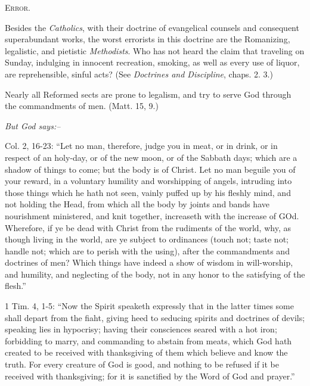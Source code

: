 \documentclass[
]{book}
\begin{document}
\begin{center}
\textsc{Error.}
\end{center}

Besides the \emph{Catholics}, with their doctrine of evangelical counsels and consequent superabundant works, the worst errorists in this doctrine are the Romanizing, legalistic, and pietistic \emph{Methodists}. Who has not heard the claim that traveling on Sunday, indulging in innocent recreation, smoking, as well as every use of liquor, are reprehensible, sinful acts? (See \emph{Doctrines and Discipline}, chaps. 2. 3.)

Nearly all Reformed sects are prone to legalism, and try to serve God through the commandments of men. (Matt. 15, 9.)

\begin{center}
\textsl{But God says:--}
\end{center}

Col. 2, 16-23: ``Let no man, therefore, judge you in meat, or in drink, or in respect of an holy-day, or of the new moon, or of the Sabbath days; which are a shadow of things to come; but the body is of Christ. Let no man beguile you of your reward, in a voluntary humility and worshipping of angels, intruding into those things which he hath not seen, vainly puffed up by his fleshly mind, and not holding the Head, from which all the body by joints and bands have nourishment ministered, and knit together, increaseth with the increase of GOd. Wherefore, if ye be dead with Christ from the rudiments of the world, why, as though living in the world, are ye subject to ordinances (touch not; taste not; handle not; which are to perish with the using), after the commandments and doctrines of men? Which things have indeed a show of wisdom in will-worship, and humility, and neglecting of the body, not in any honor to the satisfying of the flesh.''

1 Tim. 4, 1-5: ``Now the Spirit speaketh expressly that in the latter times some shall depart from the fiaht, giving heed to seducing spirits and doctrines of devils; speaking lies in hypocrisy; having their consciences seared with a hot iron; forbidding to marry, and commanding to abstain from meats, which God hath created to be received with thanksgiving of them which believe and know the truth. For every creature of God is good, and nothing to be refused if it be received with thanksgiving; for it is sanctified by the Word of God and prayer.''
\end{document}
